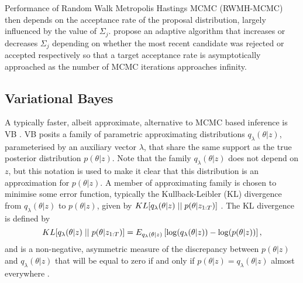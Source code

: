 \documentclass[12pt,a4paper]{article}\usepackage[]{graphicx}\usepackage[]{color}
\begin{document}
Performance of Random Walk Metropolis Hastings MCMC (RWMH-MCMC) then depends on the acceptance rate of the proposal distribution, largely influenced by the value of $\Sigma_j$. \citet{Garthwaite2016} propose an adaptive algorithm that increases or decreases $\Sigma_j$ depending on whether the most recent candidate was rejected or accepted respectively so that a target acceptance rate is asymptotically approached as the number of MCMC iterations approaches infinity.

\subsection{Variational Bayes}
\label{subsec:VB}

A typically faster, albeit approximate, alternative to MCMC based inference is VB \citep{Jordan1999}. VB posits a family of parametric approximating distributions $q_{\lambda}(\theta | z)$, parameterised by an auxiliary vector $\lambda$, that share the same support as the true posterior distribution $p(\theta | z)$. Note that the family $q_{\lambda}(\theta | z)$ does not depend on $z$, but this notation is used to make it clear that this distribution is an approximation for $p(\theta | z)$. A member of approximating family is chosen to minimise some error function, typically the Kullback-Leibler (KL) divergence from $q_{\lambda}(\theta | z)$ to $p(\theta | z)$, given by $KL[q_{\lambda}(\theta | z)\hspace{.1cm}||\hspace{.1cm}p(\theta | z_{1:T})]$ \citep{Kullback1951}. The KL divergence is defined by
\begin{equation}
\label{KL-def}
KL[q_{\lambda}(\theta | z)\hspace{.1cm}||\hspace{.1cm}p(\theta | z_{1:T})] = E_{q_{\lambda}(\theta | z)} \left[ \log(q_{\lambda}(\theta | z)) - \log(p(\theta | z)) \right],
\end{equation}
and is a non-negative, asymmetric measure of the discrepancy between $p(\theta | z)$ and $q_{\lambda}(\theta | z)$  that will be equal to zero if and only if $p(\theta | z) = q_{\lambda}(\theta | z)$ almost everywhere \citep{Bishop2006}.
\\
\end{document}
